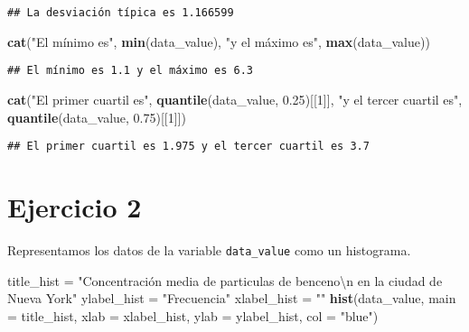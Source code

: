 \documentclass[12pt,spanish,]{article}
\newenvironment{Shaded}{\begin{snugshade}}{\end{snugshade}}
\newcommand{\KeywordTok}[1]{\textcolor[rgb]{0.13,0.29,0.53}{\textbf{{#1}}}}
\newcommand{\DataTypeTok}[1]{\textcolor[rgb]{0.13,0.29,0.53}{{#1}}}
\newcommand{\DecValTok}[1]{\textcolor[rgb]{0.00,0.00,0.81}{{#1}}}
\newcommand{\FloatTok}[1]{\textcolor[rgb]{0.00,0.00,0.81}{{#1}}}
\newcommand{\CharTok}[1]{\textcolor[rgb]{0.31,0.60,0.02}{{#1}}}
\newcommand{\StringTok}[1]{\textcolor[rgb]{0.31,0.60,0.02}{{#1}}}
\newcommand{\NormalTok}[1]{{#1}}
\begin{document}
\begin{verbatim}
## La desviación típica es 1.166599
\end{verbatim}

\begin{Shaded}
\begin{Highlighting}[]
\KeywordTok{cat}\NormalTok{(}\StringTok{"El mínimo es"}\NormalTok{, }\KeywordTok{min}\NormalTok{(data_value), }\StringTok{"y el máximo es"}\NormalTok{, }\KeywordTok{max}\NormalTok{(data_value))}
\end{Highlighting}
\end{Shaded}

\begin{verbatim}
## El mínimo es 1.1 y el máximo es 6.3
\end{verbatim}

\begin{Shaded}
\begin{Highlighting}[]
\KeywordTok{cat}\NormalTok{(}\StringTok{"El primer cuartil es"}\NormalTok{, }\KeywordTok{quantile}\NormalTok{(data_value, }\FloatTok{0.25}\NormalTok{)[[}\DecValTok{1}\NormalTok{]], }
    \StringTok{"y el tercer cuartil es"}\NormalTok{, }\KeywordTok{quantile}\NormalTok{(data_value, }\FloatTok{0.75}\NormalTok{)[[}\DecValTok{1}\NormalTok{]])}
\end{Highlighting}
\end{Shaded}

\begin{verbatim}
## El primer cuartil es 1.975 y el tercer cuartil es 3.7
\end{verbatim}

\section{Ejercicio 2}\label{ejercicio-2}

Representamos los datos de la variable \texttt{data\_value} como un
histograma.

\begin{Shaded}
\begin{Highlighting}[]
\NormalTok{title_hist =}\StringTok{ "Concentración media de particulas de benceno}\CharTok{\textbackslash{}n}\StringTok{ en la ciudad de Nueva York"}
\NormalTok{ylabel_hist =}\StringTok{ "Frecuencia"}
\NormalTok{xlabel_hist =}\StringTok{ ""}
\KeywordTok{hist}\NormalTok{(data_value, }
     \DataTypeTok{main =} \NormalTok{title_hist, }
     \DataTypeTok{xlab =} \NormalTok{xlabel_hist, }
     \DataTypeTok{ylab =} \NormalTok{ylabel_hist,}
     \DataTypeTok{col =} \StringTok{"blue"}\NormalTok{)}
\end{Highlighting}
\end{Shaded}
\end{document}

